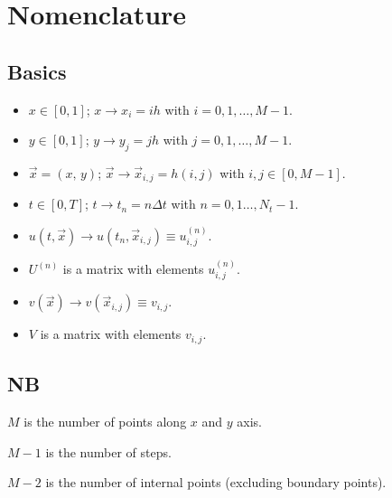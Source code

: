 \section*{Nomenclature}

    \subsection*{Basics}
        \begin{itemize}%
            \item[] $x\in[0,1]$; $x\to x_i = ih$ with $i=0,1,\dots,M-1$. \\
            \item[] $y\in[0,1]$; $y\to y_j = jh$ with $j=0,1,\dots,M-1$. \\
            \item[] $\vec{x}= (x,\, y)$; $\vec{x} \to \vec{x}_{i,j} = h(i, j)$ with $i,j\in [0,M-1]$. \\
            \item[] $t\in[0,T]$; $t\to t_n=n\Delta t$ with $n=0,1\dots,N_t-1$.\\
            \item[] $u(t, \vec{x}) \to u(t_n, \vec{x}_{i,j}) \equiv u^{(n)}_{i,j}$.\\
            \item[] $U^{(n)}$ is a matrix with elements $u^{(n)}_{i,j}$.\\
            \item[] $v(\vec{x}) \to v(\vec{x}_{i,j}) \equiv v_{i,j}$.\\
            \item[] $V$ is a matrix with elements $v_{i,j}$.
        \end{itemize}

    \subsection*{NB}
        \begin{itemize*}
            \item[] $M$ is the number of points along $x$ and $y$ axis.\\
            \item[] $M-1$ is the number of steps.\\
            \item[] $M-2$ is the number of internal points (excluding boundary points).\\
        \end{itemize*}

